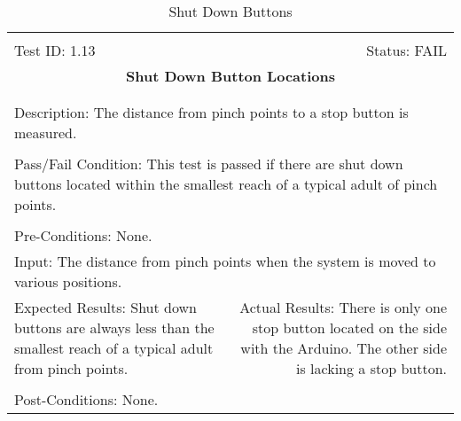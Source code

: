 \documentclass[titlepage]{article}
\begin{document}
\begin{center}
\begin{table}[h!]
\begin{tabular}{|l r|}\hline&\\[-2mm]
	Test ID: 1.13	&Status: FAIL\\[-3mm]
	\multicolumn{2}{|c|}{\textbf{\large{Shut Down Button Locations}}}\\&\\\hline&\\[-3mm]
	\multicolumn{2}{|p{\textwidth}|}{Description: The distance from pinch points to a stop button is measured.}\\[1mm]\hline&\\[-3mm]
	\multicolumn{2}{|p{\textwidth}|}{Pass/Fail Condition: This test is passed if there are shut down buttons located within the smallest reach of a typical adult of pinch points.}\\[1mm]\hline&\\[-3mm]
	\multicolumn{2}{|p{\textwidth}|}{Pre-Conditions: None.}\\[4mm]
	\multicolumn{2}{|p{\textwidth}|}{Input: The distance from pinch points when the system is moved to various positions.}\\[2mm]\hline
	\multicolumn{1}{|p{0.49\textwidth}}{Expected Results: Shut down buttons are always less than the smallest reach of a typical adult from pinch points.}	&\multicolumn{1}{|p{0.45\textwidth}|}{Actual Results: There is only one stop button located on the side with the Arduino. The other side is lacking a stop button.}\\\hline&\\[-3mm]
	\multicolumn{2}{|p{\textwidth}|}{Post-Conditions: None.}\\\hline
\end{tabular}
\caption{Shut Down Buttons}
\end{table}
\end{center}
\end{document}
